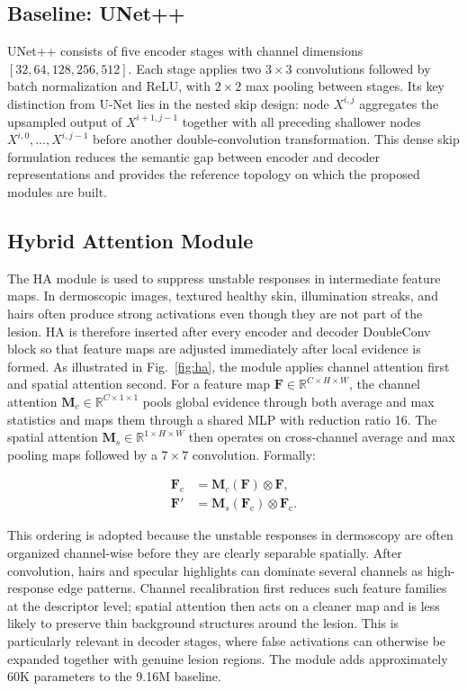 \documentclass[conference]{IEEEtran}
\begin{document}
\subsection{Baseline: UNet++}

UNet++ consists of five encoder stages with channel dimensions $[32,64,128,256,512]$. Each stage applies two $3\times3$ convolutions followed by batch normalization and ReLU, with $2\times2$ max pooling between stages. Its key distinction from U-Net lies in the nested skip design: node $X^{i,j}$ aggregates the upsampled output of $X^{i+1,j-1}$ together with all preceding shallower nodes $X^{i,0},\dots,X^{i,j-1}$ before another double-convolution transformation. This dense skip formulation reduces the semantic gap between encoder and decoder representations and provides the reference topology on which the proposed modules are built.

\subsection{Hybrid Attention Module}

The HA module is used to suppress unstable responses in intermediate feature maps. In dermoscopic images, textured healthy skin, illumination streaks, and hairs often produce strong activations even though they are not part of the lesion. HA is therefore inserted after every encoder and decoder DoubleConv block so that feature maps are adjusted immediately after local evidence is formed. As illustrated in Fig.~\ref{fig:ha}, the module applies channel attention first and spatial attention second. For a feature map $\mathbf{F}\in\mathbb{R}^{C\times H\times W}$, the channel attention $\mathbf{M}_c\in\mathbb{R}^{C\times1\times1}$ pools global evidence through both average and max statistics and maps them through a shared MLP with reduction ratio 16. The spatial attention $\mathbf{M}_s\in\mathbb{R}^{1\times H\times W}$ then operates on cross-channel average and max pooling maps followed by a $7\times7$ convolution. Formally:

\begin{equation}
\begin{aligned}
\mathbf{F}_{\text{c}} &= \mathbf{M}_c(\mathbf{F}) \otimes \mathbf{F}, \\
\mathbf{F}' &= \mathbf{M}_s(\mathbf{F}_{\text{c}}) \otimes \mathbf{F}_{\text{c}}.
\end{aligned}
\end{equation}

This ordering is adopted because the unstable responses in dermoscopy are often organized channel-wise before they are clearly separable spatially. After convolution, hairs and specular highlights can dominate several channels as high-response edge patterns. Channel recalibration first reduces such feature families at the descriptor level; spatial attention then acts on a cleaner map and is less likely to preserve thin background structures around the lesion. This is particularly relevant in decoder stages, where false activations can otherwise be expanded together with genuine lesion regions. The module adds approximately 60K parameters to the 9.16M baseline.
\end{document}
